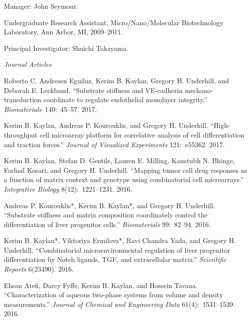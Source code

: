 \documentclass[11pt,article,oneside]{memoir}
\begin{document}
\ind \hspace{0.35in} \footnotesize Manager: John Seymour.\normalsize\vspace{0.05in}

\ind Undergraduate Research Assistant, Micro/Nano/Molecular Biotechnology Laboratory, Ann Arbor, MI, 2009--2011.

\ind \hspace{0.35in} \footnotesize Principal Investigator: Shuichi Takayama.\normalsize\vspace{0.05in}
 
\bigskip
 

\medskip\vspace{0.20em}

\noindent\emph{Journal Articles \vspace{0.05in}}

\ind Roberto C. Andresen Eguiluz, Kerim B. Kaylan, Gregory H. Underhill, and Deborah E. Leckband. ``Substrate stiffness and VE-cadherin mechano-transduction coordinate to regulate endothelial monolayer integrity.'' \emph{Biomaterials}~140:~45--57. 2017.

\ind Kerim B. Kaylan, Andreas P. Kourouklis, and Gregory H. Underhill. ``High-throughput cell microarray platform for correlative analysis of cell differentiation and traction forces.'' \emph{Journal of Visualized Experiments} 121:~e55362. 2017.

\ind Kerim B. Kaylan, Stefan D. Gentile, Lauren E. Milling, Kaustubh N. Bhinge, Farhad Kosari, and Gregory H. Underhill. ``Mapping tumor cell drug responses as a function of matrix context and genotype using combinatorial cell microarrays.'' \emph{Integrative Biology} 8(12):~1221--1231. 2016.

\ind Andreas P. Kourouklis*, Kerim B. Kaylan*, and Gregory H. Underhill. ``Substrate stiffness and matrix composition coordinately control the differentiation of liver progenitor cells.'' \emph{Biomaterials} 99:~82--94. 2016.

\ind Kerim B. Kaylan*, Viktoriya Ermilova*, Ravi Chandra Yada, and Gregory H. Underhill. ``Combinatorial microenvironmental regulation of liver progenitor differentiation by Notch ligands, TGF\textbeta, and extracellular matrix.'' \emph{Scientific Reports} 6(23490). 2016.

\ind Ehsan Atefi, Darcy Fyffe, Kerim B. Kaylan, and Hossein Tavana. ``Characterization of aqueous two-phase systems from volume and density measurements.'' \emph{Journal of Chemical and Engineering Data} 61(4):~1531--1539. 2016.
\end{document}
